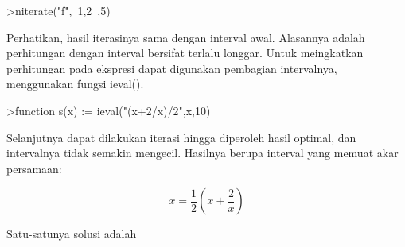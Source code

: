 \documentclass[12pt,Times new roman,letterpaper]{book}
\begin{document}
\begin{eulernootebook}
\begin{eulercomment}
\begin{eulercomment}
\begin{eulernootebook}
\begin{eulercomment}
\begin{eulercomment}
\begin{eulercomment}
\begin{eulercomment}
\begin{eulercomment}
\begin{eulercomment}
\begin{eulernotebook}
\begin{eulercomment}
\begin{eulercomment}
\begin{eulercomment}
\begin{eulercomment}
\begin{eulercomment}
\begin{eulercomment}
\begin{eulercomment}
\begin{eulercomment}
\begin{eulercomment}
\begin{eulercomment}
\begin{eulercomment}
\begin{eulercomment}
\begin{eulercomment}
\begin{eulercomment}
\begin{eulercomment}
\begin{eulercomment}
\begin{eulercomment}
\begin{eulercomment}
\begin{eulercomment}
\begin{eulercomment}
\begin{eulercomment}
\begin{eulercomment}
\begin{eulercomment}
\begin{eulercomment}
\begin{eulercomment}
\begin{eulercomment}
\begin{eulercomment}
\begin{eulercomment}
\begin{eulercomment}
\begin{eulercomment}
\begin{eulerprompt}
>niterate("f",~1,2~,5)
\end{eulerprompt}
\begin{euleroutput}
  [ ~1,2~,  ~1,2~,  ~1,2~,  ~1,2~,  ~1,2~,  ~1,2~ ]
\end{euleroutput}
\begin{eulercomment}
Perhatikan, hasil iterasinya sama dengan interval awal. Alasannya
adalah perhitungan dengan interval bersifat terlalu longgar. Untuk
meingkatkan perhitungan pada ekspresi dapat digunakan pembagian
intervalnya, menggunakan fungsi ieval().
\end{eulercomment}
\begin{eulerprompt}
>function s(x) := ieval("(x+2/x)/2",x,10)
\end{eulerprompt}
\begin{eulercomment}
Selanjutnya dapat dilakukan iterasi hingga diperoleh hasil optimal,
dan intervalnya tidak semakin mengecil. Hasilnya berupa interval yang
memuat akar persamaan:

\end{eulercomment}
\begin{eulerformula}
\[
x = \frac{1}{2} \left( x + \frac{2}{x} \right)
\]
\end{eulerformula}
\begin{eulercomment}
Satu-satunya solusi adalah


\end{eulercomment}
\end{eulercomment}
\end{eulercomment}
\end{eulercomment}
\end{eulercomment}
\end{eulercomment}
\end{eulercomment}
\end{eulercomment}
\end{eulercomment}
\end{eulercomment}
\end{eulercomment}
\end{eulercomment}
\end{eulercomment}
\end{eulercomment}
\end{eulercomment}
\end{eulercomment}
\end{eulercomment}
\end{eulercomment}
\end{eulercomment}
\end{eulercomment}
\end{eulercomment}
\end{eulercomment}
\end{eulercomment}
\end{eulercomment}
\end{eulercomment}
\end{eulercomment}
\end{eulercomment}
\end{eulercomment}
\end{eulercomment}
\end{eulercomment}
\end{eulercomment}
\end{eulernotebook}
\end{eulercomment}
\end{eulercomment}
\end{eulercomment}
\end{eulercomment}
\end{eulercomment}
\end{eulercomment}
\end{eulernootebook}
\end{eulercomment}
\end{eulercomment}
\end{eulernootebook}
\end{document}
